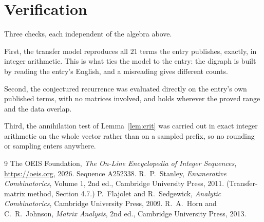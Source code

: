\documentclass[11pt,a4paper]{article}
\theoremstyle{plain}
\theoremstyle{definition}
\begin{document}
\section{Verification}

Three checks, each independent of the algebra above.

First, the transfer model reproduces all $21$ terms the entry publishes, exactly, in
integer arithmetic. This is what ties the model to the entry: the digraph is built by reading
the entry's English, and a misreading gives different counts.

Second, the conjectured recurrence was evaluated directly on the entry's own published terms,
with no matrices involved, and holds wherever the proved range and the data overlap.

Third, the annihilation test of Lemma~\ref{lem:crit} was carried out in exact integer
arithmetic on the whole vector rather than on a sampled prefix, so no rounding or sampling
enters anywhere.

\begin{thebibliography}{9}
 The OEIS Foundation, \emph{The On-Line Encyclopedia of Integer
Sequences}, \url{https://oeis.org}, 2026. Sequence A252338.
 R.~P.~Stanley, \emph{Enumerative Combinatorics}, Volume 1, 2nd ed.,
Cambridge University Press, 2011. (Transfer-matrix method, Section 4.7.)
 P.~Flajolet and R.~Sedgewick, \emph{Analytic Combinatorics}, Cambridge
University Press, 2009.
 R.~A.~Horn and C.~R.~Johnson, \emph{Matrix Analysis}, 2nd ed., Cambridge
University Press, 2013.
\end{thebibliography}
\end{document}
